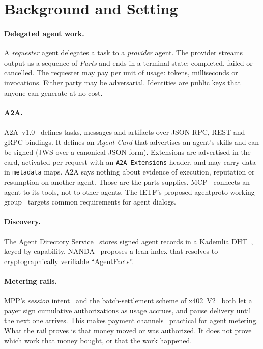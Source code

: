 \section{Background and Setting}
\label{sec:background}

\paragraph{Delegated agent work.}
A \emph{requester} agent delegates a task to a \emph{provider} agent.
The provider streams output as a sequence of \emph{Parts} and ends in a
terminal state: completed, failed or cancelled. The requester may pay per
unit of usage: tokens, milliseconds or invocations. Either party may be
adversarial. Identities are public keys that anyone can generate at no
cost.

\paragraph{A2A.}
A2A~v1.0~\cite{a2a2026} defines tasks, messages and artifacts over
JSON-RPC, REST and gRPC bindings. It defines an \emph{Agent Card} that
advertises an agent's skills and can be signed (JWS over a canonical JSON
form). Extensions are advertised in the card, activated per request with
an \texttt{A2A-Extensions} header, and may carry data in
\texttt{metadata} maps. A2A says nothing about evidence of execution,
reputation or resumption on another agent. Those are the parts \sys{}
supplies. MCP~\cite{mcp2025} connects an agent to its tools, not to other
agents. The IETF's proposed agentproto working group~\cite{agentproto2026}
targets common requirements for agent dialogs.

\paragraph{Discovery.}
The Agent Directory Service~\cite{ads2026} stores signed agent records
in a Kademlia DHT~\cite{maymounkov2002kademlia}, keyed by capability.
NANDA~\cite{nanda2025} proposes a lean index that resolves to
cryptographically verifiable ``AgentFacts''.

\paragraph{Metering rails.}
MPP's \emph{session} intent~\cite{mpp2026} and the batch-settlement scheme
of x402~V2~\cite{x402v2} both let a payer sign cumulative authorizations
as usage accrues, and pause delivery until the next one arrives. This
makes payment channels~\cite{poon2016lightning} practical for agent
metering. What the rail proves is that money moved or was authorized. It
does not prove which work that money bought, or that the work happened.

